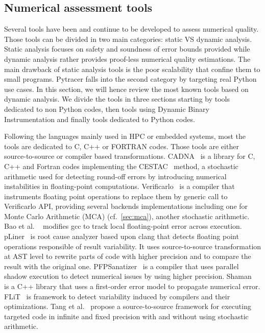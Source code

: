 \documentclass[11pt]{article}
\begin{document}
\label{sec:soa}
\subsection{Numerical assessment tools}

Several tools have been and continue to be developed to assess numerical quality.
Those tools can be divided in two main categories: static VS dynamic analysis.
Static analysis focuses on safety and soundness of error bounds provided 
while dynamic analysis rather provides proof-less numerical quality estimations.
The main drawback of static analysis tools is the poor scalability that confine them to small programs.
Pytracer falls into the second category by targeting real Python use cases.
In this section, we will hence review the most known tools based on dynamic analysis.
We divide the tools in three sections starting by tools dedicated to non Python codes, then 
tools using Dynamic Binary Instrumentation and finally tools dedicated to Python codes.

Following the languages mainly used in HPC or embedded systems, 
most the tools are dedicated to C, C++ or FORTRAN codes. 
Those tools are either source-to-source or compiler based transformations.
CADNA~\cite{jezequel2008cadna} is a library for C, C++ and Fortran codes implementing
the CESTAC~\cite{vignes1993stochastic} method, a stochastic arithmetic used for detecting round-off
errors by introducing numerical instabilities in floating-point computations.
Verificarlo~\cite{verificarlo} is a compiler that instruments floating point operations
to replace them by generic call to Verificarlo API, providing several backends implementations including one for 
Monte Carlo Arithmetic (MCA) (cf.~\ref{sec:mca}), another stochastic arithmetic.
Bao et al. ~\cite{bao2013fly} modifies gcc to track local floating-point error across execution.
pLiner~\cite{guo2020pliner} is root cause analyzer based upon clang that detects floating point operations 
responsible of result variability. 
It uses source-to-source transformation at AST level to rewrite parts of code with higher precision and to compare the result with
the original one. PFPSanatizer~\cite{chowdhary2021parallel} is a compiler that uses parallel shadow execution to detect numerical issues
by using higher precision. 
Shaman~\cite{demeure_phd} is a C++ library that uses a first-order error model to propagate numerical error. 
FLiT~\cite{sawaya2017flit} is framework to detect variability induced by compilers and their optimizations.
Tang et al.~\cite{tang2016software} propose a source-to-source framework for executing targeted code 
in infinite and fixed precision with and without using stochastic arithmetic.
\end{document}
